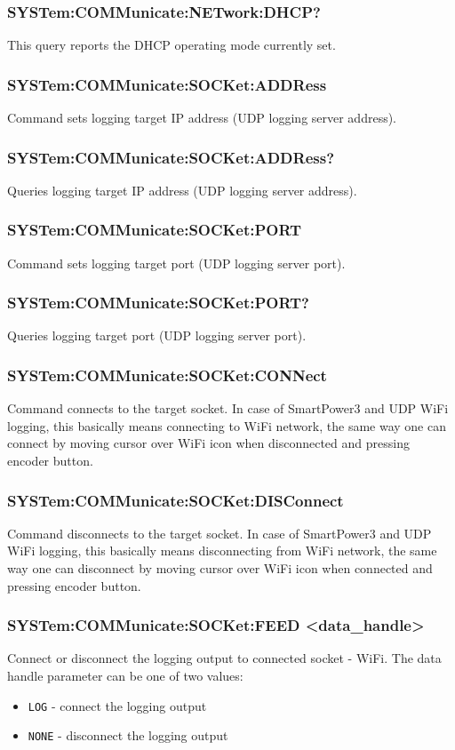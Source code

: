 \documentclass[a4paper,10pt]{article}
\begin{document}
		\subsubsection{SYSTem:COMMunicate:NETwork:DHCP?}
		        This query reports the DHCP operating mode currently set.
		\subsubsection{SYSTem:COMMunicate:SOCKet:ADDRess}
		        Command sets logging target IP address (UDP logging server address). 
		\subsubsection{SYSTem:COMMunicate:SOCKet:ADDRess?}
		        Queries logging target IP address (UDP logging server address).
		\subsubsection{SYSTem:COMMunicate:SOCKet:PORT}
		        Command sets logging target port (UDP logging server port).
		\subsubsection{SYSTem:COMMunicate:SOCKet:PORT?}
		        Queries logging target port (UDP logging server port).
		\subsubsection{SYSTem:COMMunicate:SOCKet:CONNect}
		        Command connects to the target socket. In case of SmartPower3 and UDP WiFi logging, this basically means connecting to WiFi network, the same way one can connect by moving cursor over WiFi icon when disconnected and pressing encoder button.
		\subsubsection{SYSTem:COMMunicate:SOCKet:DISConnect}
		        Command disconnects to the target socket. In case of SmartPower3 and UDP WiFi logging, this basically means disconnecting from WiFi network, the same way one can disconnect by moving cursor over WiFi icon when connected and pressing encoder button.
        \subsubsection{SYSTem:COMMunicate:SOCKet:FEED <data\_handle>}
                Connect or disconnect the logging output to connected socket - WiFi.
                The data handle parameter can be one of two values:
                \begin{itemize}
                    \item \verb|LOG| - connect the logging output
                    \item \verb|NONE| - disconnect the logging output
                \end{itemize}
\end{document}
